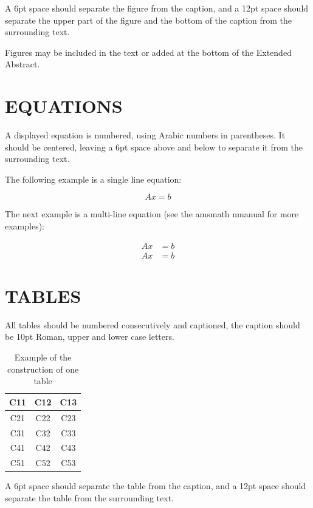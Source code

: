 \documentclass{nordic}
\begin{document}
A 6pt space should separate the figure from the caption, and a
12pt space should separate the upper part of the figure and the
bottom of the caption from the surrounding text.

Figures may be included in the text or added at the bottom of the
Extended Abstract.


\section{EQUATIONS}

A displayed equation is numbered, using Arabic numbers in
parentheses. It should be centered, leaving a 6pt space above and
below to separate it from the surrounding text.

The following example is a single line equation:

\begin{equation}
Ax = b
\end{equation}
\eject

The next example is a multi-line equation (see the amsmath nmanual for more examples):

\begin{align}
Ax &= b \\
Ax &= b \nonumber
\end{align}

\section{TABLES}

All tables should be numbered consecutively and captioned, the caption should be 10pt Roman, upper and lower
case letters.

\begin{table}[h!]
\centering
\begin{tabular}{*{3}{|c}|} %
\hline
C11 & C12 & C13 \\
\hline
C21 & C22 & C23 \\
\hline
C31 & C32 & C33 \\
\hline
C41 & C42 & C43 \\
\hline
C51 & C52 & C53 \\
\hline
\end{tabular}
\caption{Example of the construction of one table}
\end{table}

A 6pt space should separate the table from the caption, and a 12pt space should separate the table from the
surrounding text.
\end{document}
